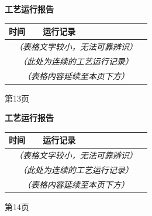 \documentclass[UTF8,10pt,a4paper,fontset=fandol]{ctexart}
\begin{document}
\newpage

\noindent
\begin{minipage}[t]{0.48\textwidth}
\centering
\textbf{工艺运行报告}

\vspace{0.3em}
\begin{tabular}{|p{0.22\linewidth}|p{0.70\linewidth}|}
\hline
时间 & 运行记录 \\ \hline
\multicolumn{2}{|c|}{\textit{（表格文字较小，无法可靠辨识）}} \\ \hline
\multicolumn{2}{|c|}{\textit{（此处为连续的工艺运行记录）}} \\ \hline
\multicolumn{2}{|c|}{\textit{（表格内容延续至本页下方）}} \\ \hline
\end{tabular}

\vfill
第13页
\end{minipage}
\hfill
\begin{minipage}[t]{0.48\textwidth}
\centering
\textbf{工艺运行报告}

\vspace{0.3em}
\begin{tabular}{|p{0.22\linewidth}|p{0.70\linewidth}|}
\hline
时间 & 运行记录 \\ \hline
\multicolumn{2}{|c|}{\textit{（表格文字较小，无法可靠辨识）}} \\ \hline
\multicolumn{2}{|c|}{\textit{（此处为连续的工艺运行记录）}} \\ \hline
\multicolumn{2}{|c|}{\textit{（表格内容延续至本页下方）}} \\ \hline
\end{tabular}

\vfill
第14页
\end{minipage}

\vspace{2em}
\end{document}
